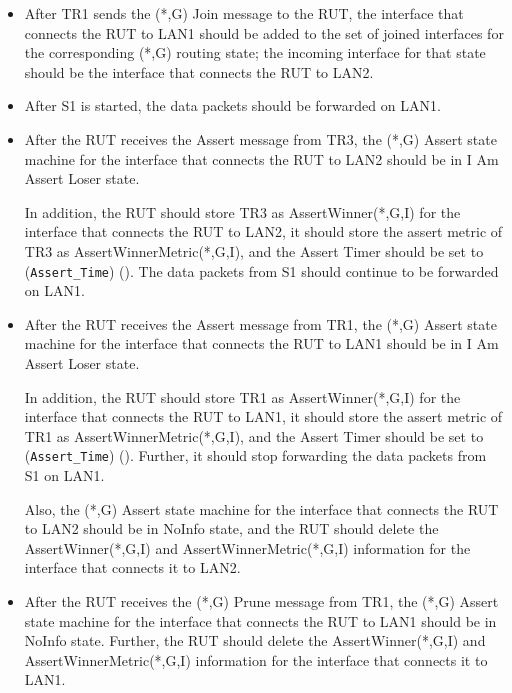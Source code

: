 \documentclass[11pt]{report}
\begin{document}

\begin{itemize}

  \item After TR1 sends the (*,G) Join message to the RUT, the interface that
  connects the RUT to LAN1 should be added to the set of joined interfaces for
  the corresponding (*,G) routing state; the incoming interface for that state
  should be the interface that connects the RUT to LAN2.

  \item After S1 is started, the data packets should be forwarded on LAN1.

  \item After the RUT receives the Assert message from TR3, the (*,G)
  Assert state machine for the interface that connects the RUT to LAN2 should
  be in I Am Assert Loser state.

  In addition, the RUT should store TR3 as AssertWinner(*,G,I) for the
  interface that connects the RUT to LAN2, it should store the assert metric
  of TR3 as AssertWinnerMetric(*,G,I), and the Assert Timer should be set to
  (\verb=Assert_Time=) ({\PimsmAssertTime}).
  The data packets from S1 should continue to be forwarded on LAN1.

  \item After the RUT receives the Assert message from TR1, the (*,G)
  Assert state machine for the interface that connects the RUT to LAN1 should
  be in I Am Assert Loser state.

  In addition, the RUT should store TR1 as AssertWinner(*,G,I) for the
  interface that connects the RUT to LAN1, it should store the assert metric
  of TR1 as AssertWinnerMetric(*,G,I), and the Assert Timer should be set to
  (\verb=Assert_Time=) ({\PimsmAssertTime}).
  Further, it should stop forwarding the data packets from S1 on LAN1.

  Also, the (*,G) Assert state machine for the interface that connects the RUT
  to LAN2 should be in NoInfo state, and the RUT should delete the
  AssertWinner(*,G,I) and AssertWinnerMetric(*,G,I) information for the
  interface that connects it to LAN2.

  \item After the RUT receives the (*,G) Prune message from TR1, the (*,G)
  Assert state machine for the interface that connects the RUT to LAN1 should
  be in NoInfo state.
  Further, the RUT should delete the AssertWinner(*,G,I) and
  AssertWinnerMetric(*,G,I) information for the interface that connects it to
  LAN1.

\end{itemize}
\end{document}
